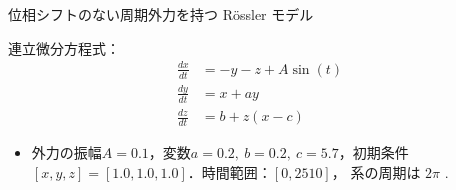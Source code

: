 \begin{frame}{位相シフトのない周期外力を持つ Rössler モデル}
\begin{minipage}{0.4\textwidth}
            連立微分方程式：
            \begin{align}
                \frac{dx}{dt} &= -y - z + A \sin(t)\\
                \frac{dy}{dt} &= x + ay \\
                \frac{dz}{dt} &= b + z(x - c)
            \end{align}
            \vspace{-.5cm}
            \begin{itemize}
                \item 外力の振幅$A = 0.1$，変数$a = 0.2,\ b = 0.2,\ c = 5.7$，初期条件$ \left[ x, y, z \right] = [1.0, 1.0, 1.0]$．時間範囲：$[0, 2510]$， 系の周期は $2\pi$ .
            \end{itemize}
        \end{minipage}
\end{frame}

